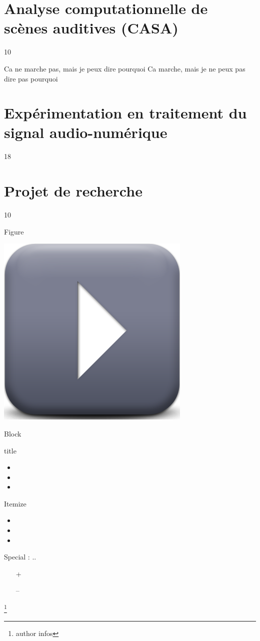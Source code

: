 \documentclass[compress]{beamer}
\let\oldfootnote\footnote
\renewcommand\footnote[1]{\let\thefootnote\relax%
\oldfootnote{#1}}
\newcommand\citenote[4]{\footnote{#3 \href{#2}{\structure{#1}} #4}}
\begin{document}
\section[CASA]{Analyse computationnelle de scènes auditives (CASA)} 10



Ca ne marche pas, mais je peux dire pourquoi
Ca marche, mais je ne peux pas dire pas pourquoi

\section[Expérimentation]{Expérimentation en traitement du signal audio-numérique} 18

\section[Projet]{Projet de recherche} 10


\begin{frame}{} \tableofcontents[currentsection] \end{frame}

\begin{frame}{Figure}
\begin{center}
\includegraphics[width=.6\columnwidth]{figures/play} \\
\end{center}
\end{frame}

\begin{frame}{Block}
\begin{block}{title}
\begin{itemize}
\item
\item
\item
\end{itemize}
\end{block}
\end{frame}


\begin{frame}{Itemize}
\begin{itemize}
\item
\item
\item
\end{itemize}
\end{frame}

\begin{frame}{Special}
: ..
\begin{itemize}
\item[+]
\item[--]
\end{itemize}
\citenote{title}{http://www.google.com}{author}{infos}
\end{frame}
\end{document}

